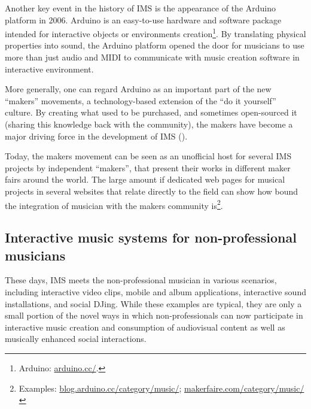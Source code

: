 \documentclass[a4paper,11pt]{article}
\begin{document}
Another key event in the history of IMS is the appearance of the Arduino platform in 2006.
Arduino is an easy-to-use hardware and software package intended for interactive objects or environments creation\footnote{Arduino: \href{http://arduino.cc/}{arduino.cc/}.}.
By translating physical properties into sound, the Arduino platform opened the door for musicians to use more than just audio and MIDI to communicate with music creation software in interactive environment.

More generally, one can regard Arduino as an important part of the new ``makers'' movements, a technology-based extension of the ``do it yourself'' culture.
By creating what used to be purchased, and sometimes open-sourced it (sharing this knowledge back with the community), the makers have become a major driving force in the development of IMS (\cite{web:kirn12}).

Today, the makers movement can be seen as an unofficial host for several IMS projects by independent ``makers'', that present their works in different maker fairs around the world.
The large amount if dedicated web pages for musical projects in several websites that relate directly to the field can show how bound the integration of musician with the makers community is\footnote{Examples: \href{http://blog.arduino.cc/category/music/}{blog.arduino.cc/category/music/}; \href{http://makerfaire.com/category/music/}{makerfaire.com/category/music/}}.

\subsection{Interactive music systems for non-professional musicians} \label{literature:non_pro_ims}

These days, IMS meets the non-professional musician in various scenarios, including interactive video clips, mobile and album applications, interactive sound installations, and social DJing.
While these examples are typical, they are only a small portion of the novel ways in which non-professionals can now participate in interactive music creation and consumption of audiovisual content as well as musically enhanced social interactions.
\end{document}
